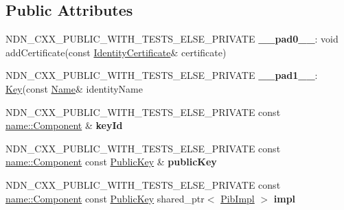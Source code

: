 \subsection*{Public Attributes}
\begin{DoxyCompactItemize}
\item 
N\+D\+N\+\_\+\+C\+X\+X\+\_\+\+P\+U\+B\+L\+I\+C\+\_\+\+W\+I\+T\+H\+\_\+\+T\+E\+S\+T\+S\+\_\+\+E\+L\+S\+E\+\_\+\+P\+R\+I\+V\+A\+TE {\bfseries \+\_\+\+\_\+pad0\+\_\+\+\_\+}\+: void add\+Certificate(const \hyperlink{classndn_1_1IdentityCertificate}{Identity\+Certificate}\& certificate)\hypertarget{classndn_1_1security_1_1Key_aa0e01042be006e2a9e942c15a070bc45}{}\label{classndn_1_1security_1_1Key_aa0e01042be006e2a9e942c15a070bc45}

\item 
N\+D\+N\+\_\+\+C\+X\+X\+\_\+\+P\+U\+B\+L\+I\+C\+\_\+\+W\+I\+T\+H\+\_\+\+T\+E\+S\+T\+S\+\_\+\+E\+L\+S\+E\+\_\+\+P\+R\+I\+V\+A\+TE {\bfseries \+\_\+\+\_\+pad1\+\_\+\+\_\+}\+: \hyperlink{classndn_1_1security_1_1Key}{Key}(const \hyperlink{classndn_1_1Name}{Name}\& identity\+Name\hypertarget{classndn_1_1security_1_1Key_a0cfe07cafa495a19e20e33970640bd53}{}\label{classndn_1_1security_1_1Key_a0cfe07cafa495a19e20e33970640bd53}

\item 
N\+D\+N\+\_\+\+C\+X\+X\+\_\+\+P\+U\+B\+L\+I\+C\+\_\+\+W\+I\+T\+H\+\_\+\+T\+E\+S\+T\+S\+\_\+\+E\+L\+S\+E\+\_\+\+P\+R\+I\+V\+A\+TE const \hyperlink{classndn_1_1name_1_1Component}{name\+::\+Component} \& {\bfseries key\+Id}\hypertarget{classndn_1_1security_1_1Key_a60c6c52b1530f3c29308bef7fa478f1f}{}\label{classndn_1_1security_1_1Key_a60c6c52b1530f3c29308bef7fa478f1f}

\item 
N\+D\+N\+\_\+\+C\+X\+X\+\_\+\+P\+U\+B\+L\+I\+C\+\_\+\+W\+I\+T\+H\+\_\+\+T\+E\+S\+T\+S\+\_\+\+E\+L\+S\+E\+\_\+\+P\+R\+I\+V\+A\+TE const \hyperlink{classndn_1_1name_1_1Component}{name\+::\+Component} const \hyperlink{classndn_1_1PublicKey}{Public\+Key} \& {\bfseries public\+Key}\hypertarget{classndn_1_1security_1_1Key_a30e0e5f1e3aabd7c02d164e619bfdb96}{}\label{classndn_1_1security_1_1Key_a30e0e5f1e3aabd7c02d164e619bfdb96}

\item 
N\+D\+N\+\_\+\+C\+X\+X\+\_\+\+P\+U\+B\+L\+I\+C\+\_\+\+W\+I\+T\+H\+\_\+\+T\+E\+S\+T\+S\+\_\+\+E\+L\+S\+E\+\_\+\+P\+R\+I\+V\+A\+TE const \hyperlink{classndn_1_1name_1_1Component}{name\+::\+Component} const \hyperlink{classndn_1_1PublicKey}{Public\+Key} shared\+\_\+ptr$<$ \hyperlink{classndn_1_1security_1_1PibImpl}{Pib\+Impl} $>$ {\bfseries impl}\hypertarget{classndn_1_1security_1_1Key_a9ff95a9c6de273df523e7fdd6e3edcf3}{}\label{classndn_1_1security_1_1Key_a9ff95a9c6de273df523e7fdd6e3edcf3}

\end{DoxyCompactItemize}
